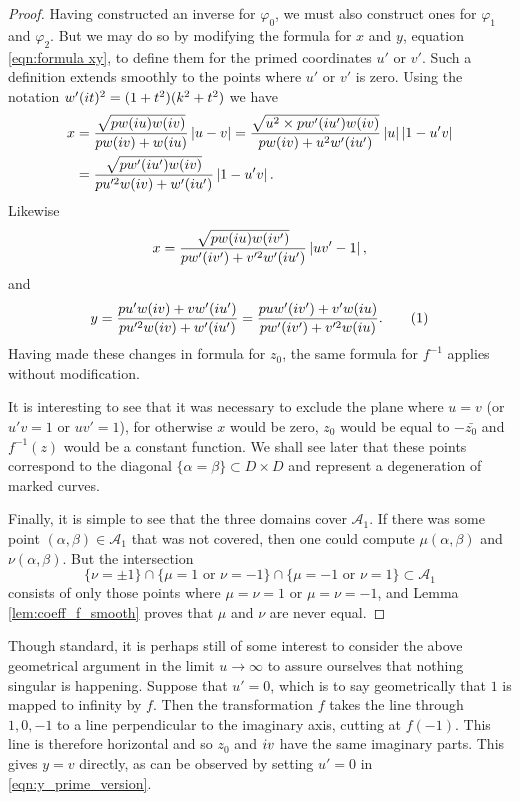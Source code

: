 \begin{lem}
\begin{proof}
Having constructed an inverse for $φ_0$, we must also construct ones for $φ_1$ and $φ_2$. But we may do so by modifying the formula for $x$ and $y$, equation \eqref{eqn:formula xy}, to define them for the primed coordinates $u'$ or $v'$. Such a definition extends smoothly to the points where $u'$ or $v'$ is zero. Using the notation $w'(i t)^2 = (1+t^2)(k^2 + t^2)$ we have
\begin{align*}
x
&= \frac{\sqrt{pw(i u)w(i v)}}{pw(i v) + w(i u)} \left|u-v\right|
= \frac{\sqrt{u^2 \times pw'(i u')w(i v)}}{pw(i v) + u^2 w'(i u')} \left|u\right|\left|1-u'v\right| \\
&= \frac{\sqrt{pw'(i u')w(i v)}}{pu'^2w(i v) + w'(i u')} \left|1-u'v\right|.
\end{align*}
Likewise
\[
x
= \frac{\sqrt{pw(i u)w(i v')}}{pw'(i v') + v'^2w'(i u')} \left|uv'-1\right|,
\]
and
\[
y
= \frac{pu'w(\iu v) + vw'(\iu u')}{pu'^2w(\iu v) + w'(\iu u')}
= \frac{puw'(\iu v') + v'w(\iu u)}{pw'(\iu v') + v'^2w(\iu u)}. \labelthis{eqn:y_prime_version}
\]
Having made these changes in formula for $z_0$, the same formula for $f^{-1}$ applies without modification.

It is interesting to see that it was necessary to exclude the plane where $u=v$ (or $u'v=1$ or $uv'=1$), for otherwise $x$ would be zero, $z_0$ would be equal to $-\bar{z_0}$ and $f^{-1}(z)$ would be a constant function. We shall see later that these points correspond to the diagonal $\{α=β\} \subset D\times D$ and represent a degeneration of marked curves.

Finally, it is simple to see that the three domains cover $\mathcal{A}_1$. If there was some point $(α,β) \in \mathcal{A}_1$ that was not covered, then one could compute $μ(α,β)$ and $ν(α,β)$. But the intersection
\[
\{ν = \pm 1\}
\cap \{μ = 1 \text{ or } ν = -1 \}
\cap \{μ = -1 \text{ or } ν = 1 \} \subset \mathcal{A}_1
\]
consists of only those points where $μ=ν=1$ or $μ=ν=-1$, and Lemma \ref{lem:coeff_f_smooth} proves that $μ$ and $ν$ are never equal.
\end{proof}
\end{lem}

Though standard, it is perhaps still of some interest to consider the above geometrical argument in the limit $u\to\infty$ to assure ourselves that nothing singular is happening. Suppose that $u' = 0$, which is to say geometrically that $1$ is mapped to infinity by $f$. Then the transformation $f$ takes the line through $1,0,-1$ to a line perpendicular to the imaginary axis, cutting at $f(-1)$. This line is therefore horizontal and so $z_0$ and $i v$ have the same imaginary parts. This gives $y=v$ directly, as can be observed by setting $u'=0$ in \eqref{eqn:y_prime_version}.

